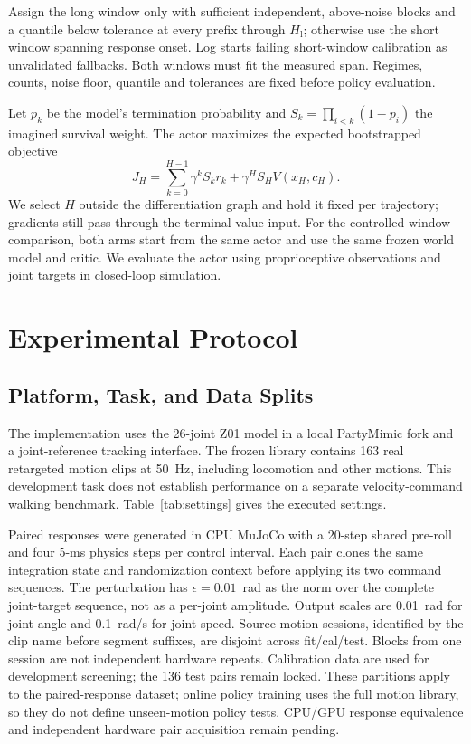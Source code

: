 \documentclass[letterpaper,10pt,conference]{ieeeconf}
\newcommand{\Hlong}{H_{\mathrm{l}}}
\begin{document}
Assign the long window only with sufficient independent, above-noise blocks and a quantile below tolerance at every prefix through $\Hlong$; otherwise use the short window spanning response onset. Log starts failing short-window calibration as unvalidated fallbacks. Both windows must fit the measured span. Regimes, counts, noise floor, quantile and tolerances are fixed before policy evaluation.

Let $p_k$ be the model's termination probability and $S_k=\prod_{i<k}(1-p_i)$ the imagined survival weight. The actor maximizes the expected bootstrapped objective
\begin{equation}\label{eq:actor}
 J_H = \sum_{k=0}^{H-1}\gamma^k S_k r_k+\gamma^H S_H V(x_H,c_H).
\end{equation}
We select $H$ outside the differentiation graph and hold it fixed per trajectory; gradients still pass through the terminal value input. For the controlled window comparison, both arms start from the same actor and use the same frozen world model and critic. We evaluate the actor using proprioceptive observations and joint targets in closed-loop simulation.

\section{Experimental Protocol}
\subsection{Platform, Task, and Data Splits}
The implementation uses the 26-joint Z01 model in a local PartyMimic fork and a joint-reference tracking interface. The frozen library contains 163 real retargeted motion clips at 50~Hz, including locomotion and other motions. This development task does not establish performance on a separate velocity-command walking benchmark. Table~\ref{tab:settings} gives the executed settings.

Paired responses were generated in CPU MuJoCo with a 20-step shared pre-roll and four 5-ms physics steps per control interval. Each pair clones the same integration state and randomization context before applying its two command sequences. The perturbation has $\epsilon=0.01$~rad as the norm over the complete joint-target sequence, not as a per-joint amplitude. Output scales are 0.01~rad for joint angle and 0.1~rad/s for joint speed. Source motion sessions, identified by the clip name before segment suffixes, are disjoint across fit/cal/test. Blocks from one session are not independent hardware repeats. Calibration data are used for development screening; the 136 test pairs remain locked. These partitions apply to the paired-response dataset; online policy training uses the full motion library, so they do not define unseen-motion policy tests. CPU/GPU response equivalence and independent hardware pair acquisition remain pending.
\end{document}
